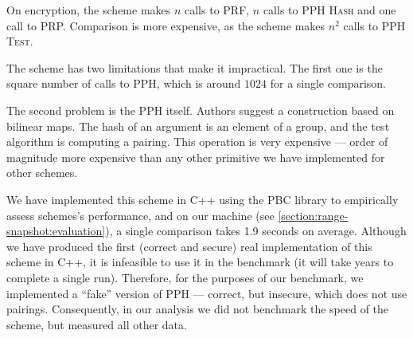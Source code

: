 		On encryption, the scheme makes $n$ calls to PRF, $n$ calls to PPH \textsc{Hash} and one call to PRP\@.
		Comparison is more expensive, as the scheme makes $n^2$ calls to PPH \textsc{Test}.

		The scheme has two limitations that make it impractical.
		The first one is the square number of calls to PPH, which is around $1024$ for a single comparison.

		The second problem is the PPH itself.
		Authors suggest a construction based on bilinear maps.
		The hash of an argument is an element of a group, and the test algorithm is computing a pairing.
		This operation is very expensive --- order of magnitude more expensive than any other primitive we have implemented for other schemes.

		We have implemented this scheme in C++ using the PBC library \cite{pbc} to empirically assess schemes's performance, and on our machine (see \cref{section:range-snapshot:evaluation}), a single comparison takes 1.9 seconds on average.
		Although we have produced the first (correct and secure) real implementation of this scheme in C++, it is infeasible to use it in the benchmark (it will take years to complete a single run).
		Therefore, for the purposes of our benchmark, we implemented a ``fake'' version of PPH --- correct, but insecure, which does not use pairings.
		Consequently, in our analysis we did not benchmark the speed of the scheme, but measured all other data.
